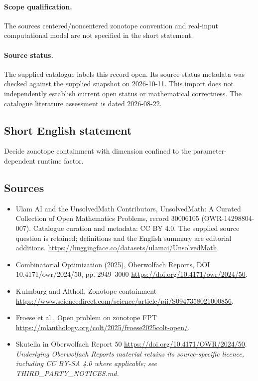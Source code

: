 \documentclass[11pt]{article}
\begin{document}
\paragraph{Scope qualification.}
The source\textquotesingle s centered/noncentered zonotope convention and real-input computational model are not specified in the short statement.
\paragraph{Source status.}
The supplied catalogue labels this record open. Its source-status metadata was checked against the supplied snapshot on 2026-10-11. This import does not independently establish current open status or mathematical correctness. The catalogue literature assessment is dated 2026-08-22.
\subsection{Short English statement}
Decide zonotope containment with dimension confined to the parameter-dependent runtime factor.
\subsection{Sources}
\begin{itemize}
\item[S1] Ulam AI and the UnsolvedMath Contributors, UnsolvedMath: A Curated Collection of Open Mathematics Problems, record 30006105 (OWR-14298804-007). Catalogue curation and metadata: CC BY 4.0. The supplied source question is retained; definitions and the English summary are editorial additions.
\url{https://huggingface.co/datasets/ulamai/UnsolvedMath}.
\item[S2] Combinatorial Optimization (2025), Oberwolfach Reports, DOI 10.4171/owr/2024/50, pp. 2949--3000
\url{https://doi.org/10.4171/owr/2024/50}.
\item[S3] Kulmburg and Althoff, Zonotope containment
\url{https://www.sciencedirect.com/science/article/pii/S0947358021000856}.
\item[S4] Froese et al., Open problem on zonotope FPT
\url{https://mlanthology.org/colt/2025/froese2025colt-open/}.
\item[S5] Skutella in Oberwolfach Report 50
\url{https://doi.org/10.4171/OWR/2024/50}.
\textit{Underlying Oberwolfach Reports material retains its source-specific licence, including CC BY-SA 4.0 where applicable; see THIRD\_PARTY\_NOTICES.md.}
\end{itemize}
\end{document}
